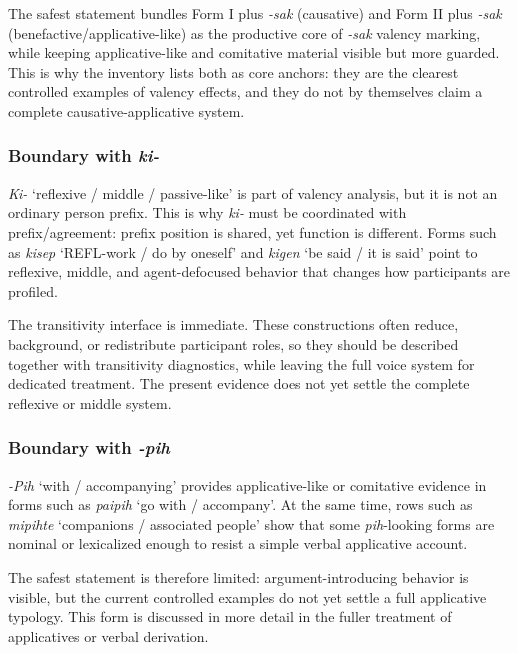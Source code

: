 \documentclass[
  11pt,
  a4paper,
]{article}
\newcommand{\tdim}[1]{\textit{#1}}
\newcommand{\glossquote}[1]{`#1'}
\begin{document}
The safest statement bundles Form I plus \tdim{-sak} (causative) and
Form II plus \tdim{-sak} (benefactive/applicative-like) as the
productive core of \tdim{-sak} valency marking, while keeping
applicative-like and comitative material visible but more guarded. This
is why the inventory lists both as core anchors: they are the clearest
controlled examples of valency effects, and they do not by themselves
claim a complete causative-applicative system.

\subsubsection{\texorpdfstring{Boundary with
\tdim{ki-}}{Boundary with }}\label{boundary-with}

\tdim{Ki-} \glossquote{reflexive / middle / passive-like} is part of
valency analysis, but it is not an ordinary person prefix. This is why
\tdim{ki-} must be coordinated with prefix/agreement: prefix position is
shared, yet function is different. Forms such as \tdim{kisep}
\glossquote{REFL-work / do by oneself} and \tdim{kigen}
\glossquote{be said / it is said} point to reflexive, middle, and
agent-defocused behavior that changes how participants are profiled.

The transitivity interface is immediate. These constructions often
reduce, background, or redistribute participant roles, so they should be
described together with transitivity diagnostics, while leaving the full
voice system for dedicated treatment. The present evidence does not yet
settle the complete reflexive or middle system.

\subsubsection{\texorpdfstring{Boundary with
\tdim{-pih}}{Boundary with }}\label{boundary-with-1}

\tdim{-Pih} \glossquote{with / accompanying} provides applicative-like
or comitative evidence in forms such as \tdim{paipih}
\glossquote{go with / accompany}. At the same time, rows such as
\tdim{mipihte} \glossquote{companions / associated people} show that
some \tdim{pih}-looking forms are nominal or lexicalized enough to
resist a simple verbal applicative account.

The safest statement is therefore limited: argument-introducing behavior
is visible, but the current controlled examples do not yet settle a full
applicative typology. This form is discussed in more detail in the
fuller treatment of applicatives or verbal derivation.
\end{document}
